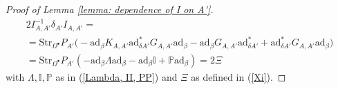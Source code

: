 \documentclass[10pt,a4paper]{amsart}
\newcommand{\BB}{\mathfrak{B}}
\newcommand{\ad}{\mathrm{ad}}
\newcommand{\bt}{\bullet}
\newcommand{\la}{\leftarrow}
\newcommand{\mc}{\mathcal}
\newcommand{\mr}{\mathrm}
\begin{document}
\begin{proof}[Proof of Lemma \ref{lemma: dependence of I on A'}]
\begin{multline}\label{lem I eq3}
 2I_{A,A'}^{-1}  \delta_{A'}I_{A,A'}=\\
 =
 \mr{Str}_{\Omega^\bt} P_{A'}\Big(-\ad_\beta K_{A,A'} \ad^*_{\delta A'}G_{A,A'}\ad_\beta-\ad_\beta G_{A,A'} \ad^*_{\delta A'}+\ad^*_{\delta A'}G_{A,A'}\ad_\beta
 \Big)
 \\ =
 \mr{Str}_{\Omega^\bt}P_{A'}(-\ad_\beta \Lambda \ad_\beta - \ad_\beta \mathbb{I} + \mathbb{P}\ad_\beta)=2\Xi
\end{multline}
with $\Lambda,\mathbb{I},\mathbb{P}$ as in (\ref{Lambda, II, PP}) and $\Xi$ as defined in (\ref{Xi}).
\end{proof}
\end{document}
